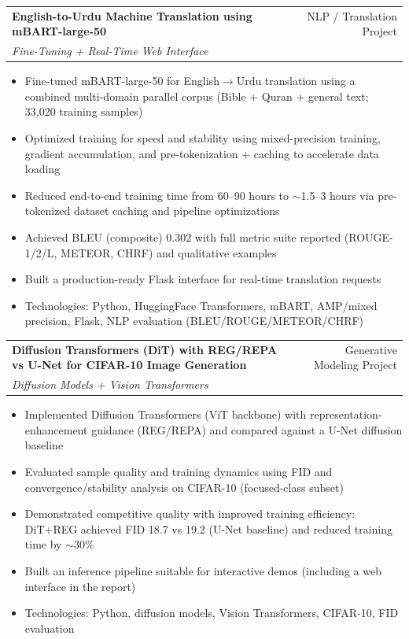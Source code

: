 \documentclass[a4paper,12pt]{article}
\makeatletter
\newenvironment{projectdetailed}[3]
    {
    \begin{tabularx}{\linewidth}{@{}l X r@{}}
    \textbf{#1} & \hfill & #2 \\
    \textit{#3} & & \\[3.75pt]
    \end{tabularx}
    \begin{minipage}[t]{\linewidth}
    \begin{itemize}[nosep,after=\strut, leftmargin=1em, itemsep=2pt,label=--]
    }
    {
    \end{itemize}
    \end{minipage}
    \vspace{6pt}
    }
\makeatother
\begin{document}
\begin{projectdetailed}{English-to-Urdu Machine Translation using mBART-large-50}{NLP / Translation Project}{Fine-Tuning + Real-Time Web Interface}
\item Fine-tuned mBART-large-50 for English$\rightarrow$Urdu translation using a combined multi-domain parallel corpus (Bible + Quran + general text; 33,020 training samples)
\item Optimized training for speed and stability using mixed-precision training, gradient accumulation, and pre-tokenization + caching to accelerate data loading
\item Reduced end-to-end training time from 60--90 hours to \(\sim\)1.5--3 hours via pre-tokenized dataset caching and pipeline optimizations
\item Achieved BLEU (composite) 0.302 with full metric suite reported (ROUGE-1/2/L, METEOR, CHRF) and qualitative examples
\item Built a production-ready Flask interface for real-time translation requests
\item Technologies: Python, HuggingFace Transformers, mBART, AMP/mixed precision, Flask, NLP evaluation (BLEU/ROUGE/METEOR/CHRF)
\end{projectdetailed}

\begin{projectdetailed}{Diffusion Transformers (DiT) with REG/REPA vs U-Net for CIFAR-10 Image Generation}{Generative Modeling Project}{Diffusion Models + Vision Transformers}
\item Implemented Diffusion Transformers (ViT backbone) with representation-enhancement guidance (REG/REPA) and compared against a U-Net diffusion baseline
\item Evaluated sample quality and training dynamics using FID and convergence/stability analysis on CIFAR-10 (focused-class subset)
\item Demonstrated competitive quality with improved training efficiency: DiT+REG achieved FID 18.7 vs 19.2 (U-Net baseline) and reduced training time by \(\sim\)30\%
\item Built an inference pipeline suitable for interactive demos (including a web interface in the report)
\item Technologies: Python, diffusion models, Vision Transformers, CIFAR-10, FID evaluation
\end{projectdetailed}
\end{document}
